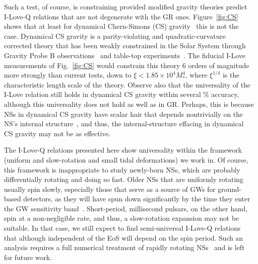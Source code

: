 \documentclass[aps,twocolumn,nofootinbib,showpacs,superscriptaddress,hyperref]{revtex4-1}
\newcommand{\NS}{*}
\begin{document}
Such a test, of course, is constraining provided modified gravity theories predict I-Love-Q relations that are not degenerate with the GR ones. Figure~\ref{fig:CS} shows that at least for dynamical Chern-Simons (CS) gravity~\cite{CSreview} this is not the case. Dynamical CS gravity is a parity-violating and quadratic-curvature corrected theory that has been weakly constrained in the Solar System through Gravity Probe B observations~\cite{alihaimoud-chen} and table-top experiments~\cite{kent-CSBH}. The fiducial I-Love measurements of Fig.~\ref{fig:CS} would constrain this theory 6 orders of magnitude more strongly than current tests, down to $\xi < 1.85 \times 10^4 M_\NS^4$, where $\xi^{1/4}$ is the characteristic length scale of the theory. Observe also that the universality of the I-Love relation still holds in dynamical CS gravity within several \% accuracy, although this universality does not hold as well as in GR. Perhaps, this is because NSs in dynamical CS gravity have scalar hair that depends nontrivially on the NS's internal structure~\cite{quadratic}, and thus, the internal-structure effacing in dynamical CS gravity may not be as effective. 

The I-Love-Q relations presented here show universality within the framework (uniform and slow-rotation and small tidal deformations) we work in. Of course, this framework is inappropriate to study newly-born NSs, which are probably differentially rotating and doing so fast. Older NSs that are uniformly rotating usually spin slowly, especially those that serve as a source of GWs for ground-based detectors, as they will have spun down significantly by the time they enter the GW sensitivity band~\cite{bildsten-cutler}. Short-period, millisecond pulsars, on the other hand, spin at a non-negligible rate, and thus, a slow-rotation expansion may not be suitable. In that case, we still expect to find semi-universal I-Love-Q relations that although independent of the EoS will depend on the spin period. Such an analysis requires a full numerical treatment of rapidly rotating NSs~\cite{berti-stergioulas,berti-white,benhar,pappas-apostolatos} and is left for future work.     
\end{document}
